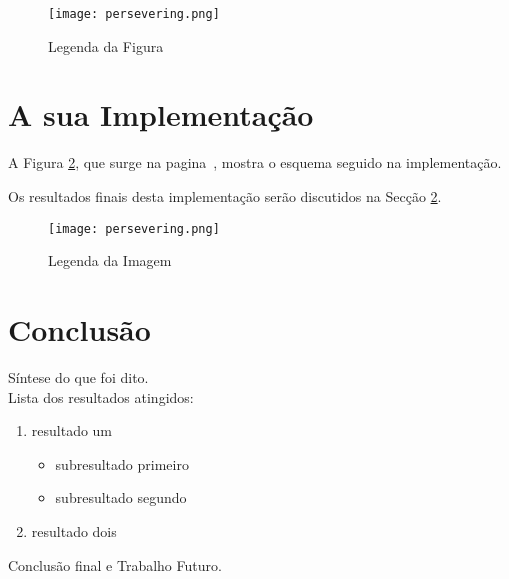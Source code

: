 \documentclass{article}%
\begin{document}
    \begin{figure} %
     \begin{center} %
         \texttt{[image: persevering.png]}
         \caption{Legenda da Figura} \label{fig:figuraA} %
        \end{center}
    \end{figure}

\section{A sua Implementação} \label{sec:implementa}
A Figura \ref{fig:figuraB}, que surge na pagina~\pageref{fig:figuraB}, %
mostra o esquema seguido na implementação.

Os resultados finais desta implementação serão discutidos na Secção \ref{sec:conclusao}.

\begin{figure}[!htbp] %
\begin{center}
    \texttt{[image: persevering.png]}
    \caption{Legenda da Imagem} \label{fig:figuraB}
\end{center}
\end{figure}

\newpage

\section{Conclusão} \label{sec:conclusao}
Síntese do que foi dito.\\
Lista dos resultados atingidos:
\begin{enumerate} %
\item resultado um
      \begin{itemize}
        \item subresultado primeiro
        \item subresultado segundo
      \end{itemize}
\item resultado dois
\end{enumerate}
Conclusão final e Trabalho Futuro.
\end{document}
